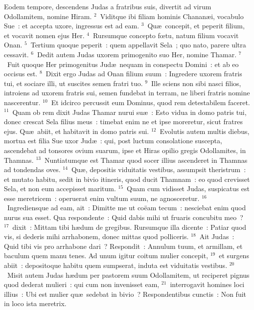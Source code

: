 \lettrine[lines=3,image=true,loversize=0.05,lraise=-0.03]{E}{}odem tempore, descendens Judas a fratribus suis, divertit ad virum Odollamitem, nomine Hiram.
${}^{2}$~Viditque ibi filiam hominis Chanan\ae i, vocabulo Sue~: et accepta uxore, ingressus est ad eam.
${}^{3}$~Qu\ae\ concepit, et peperit filium, et vocavit nomen ejus Her.
${}^{4}$~Rursumque concepto fœtu, natum filium vocavit Onan.
${}^{5}$~Tertium quoque peperit~: quem appellavit Sela~; quo nato, parere ultra cessavit.
${}^{6}$~Dedit autem Judas uxorem primogenito suo Her, nomine Thamar.
${}^{7}$~Fuit quoque Her primogenitus Jud\ae\ nequam in conspectu Domini~: et ab eo occisus est.
${}^{8}$~Dixit ergo Judas ad Onan filium suum~: Ingredere uxorem fratris tui, et sociare illi, ut suscites semen fratri tuo.
${}^{9}$~Ille sciens non sibi nasci filios, introiens ad uxorem fratris sui, semen fundebat in terram, ne liberi fratris nomine nascerentur.
${}^{10}$~Et idcirco percussit eum Dominus, quod rem detestabilem faceret.
${}^{11}$~Quam ob rem dixit Judas Thamar nurui su\ae~: Esto vidua in domo patris tui, donec crescat Sela filius meus~: timebat enim ne et ipse moreretur, sicut fratres ejus. Qu\ae\ abiit, et habitavit in domo patris sui.
${}^{12}$~Evolutis autem multis diebus, mortua est filia Sue uxor Jud\ae~: qui, post luctum consolatione suscepta, ascendebat ad tonsores ovium suarum, ipse et Hiras opilio gregis Odollamites, in Thamnas.
${}^{13}$~Nuntiatumque est Thamar quod socer illius ascenderet in Thamnas ad tondendas oves.
${}^{14}$~Qu\ae , depositis viduitatis vestibus, assumpsit theristrum~: et mutato habitu, sedit in bivio itineris, quod ducit Thamnam~: eo quod crevisset Sela, et non eum accepisset maritum.
${}^{15}$~Quam cum vidisset Judas, suspicatus est esse meretricem~: operuerat enim vultum suum, ne agnosceretur.
${}^{16}$~Ingrediensque ad eam, ait~: Dimitte me ut co\"eam tecum~: nesciebat enim quod nurus sua esset. Qua respondente~: Quid dabis mihi ut fruaris concubitu meo~?
${}^{17}$~dixit~: Mittam tibi h\ae dum de gregibus. Rursumque illa dicente~: Patiar quod vis, si dederis mihi arrhabonem, donec mittas quod polliceris.
${}^{18}$~Ait Judas~: Quid tibi vis pro arrhabone dari~? Respondit~: Annulum tuum, et armillam, et baculum quem manu tenes. Ad unum igitur coitum mulier concepit,
${}^{19}$~et surgens abiit~: depositoque habitu quem sumpserat, induta est viduitatis vestibus.
${}^{20}$~Misit autem Judas h\ae dum per pastorem suum Odollamitem, ut reciperet pignus quod dederat mulieri~: qui cum non invenisset eam,
${}^{21}$~interrogavit homines loci illius~: Ubi est mulier qu\ae\ sedebat in bivio~? Respondentibus cunctis~: Non fuit in loco ista meretrix.
